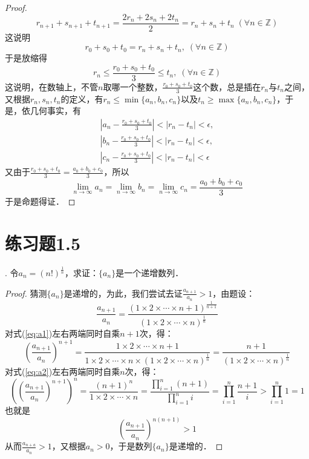 \documentclass{ctexart}
\theoremstyle{definition}
\theoremstyle{definition}
\theoremstyle{plain}
\theoremstyle{plain}
\theoremstyle{plain}
\theoremstyle{definition}
\newcommand{\integer}{\mathbb{Z}}
\begin{document}
\begin{proof}
\begin{equation}
    r_{n+1}+s_{n+1}+t_{n+1} = \frac{2r_n+2s_n+2t_n}{2} = r_n + s_n + t_n \; (\forall n \in \integer)
\end{equation}
这说明
\begin{equation}
    r_0+s_0+t_0=r_n+s_n+t_n, \; (\forall n \in \integer)
\end{equation}
于是放缩得
\begin{equation}
    r_n \leq \frac{r_0+s_0+t_0}{3} \leq t_n, \; (\forall n \in \integer)
\end{equation}
这说明，在数轴上，不管$n$取哪一个整数，$\displaystyle\frac{r_0+s_0+t_0}{3}$这个数，总是插在$r_n$与$t_n$之间，又根据$r_n,s_n,t_n$的定义，有$r_n \leq \min \{a_n,b_n,c_n\}$以及$t_n \geq \max \{a_n, b_n, c_n \}$，于是，依几何事实，有
\begin{align}
    |a_n - \frac{r_0+s_0+t_0}{3}| < |r_n - t_n| < \epsilon, \\
    |b_n - \frac{r_0+s_0+t_0}{3}| < |r_n - t_n| < \epsilon, \\
    |c_n - \frac{r_0+s_0+t_0}{3}| < |r_n - t_n| < \epsilon
\end{align}
又由于$\displaystyle\frac{r_0+s_0+t_0}{3}=\frac{a_0+b_0+c_0}{3}$，所以
\begin{equation}
    \lim_{n\to\infty} a_n = \lim_{n\to\infty} b_n = \lim_{n\to\infty} c_n = \frac{a_0+b_0+c_0}{3}
\end{equation}
于是命题得证．
\end{proof}


\section*{练习题1.5}
. 令$\displaystyle a_n = (n!)^\frac{1}{n}$，求证：$\{ a_n \}$是一个递增数列．
\begin{proof}
猜测$\{ a_n \}$是递增的，为此，我们尝试去证$\displaystyle \frac{a_{n+1}}{a_n} > 1$，由题设：
\begin{equation}
    \frac{a_{n+1}}{a_n} = \frac{(1 \times 2 \times \cdots \times n+1)^\frac{1}{n+1}}{(1 \times 2 \times \cdots \times n)^\frac{1}{n}}
    \label{eq:a1}
\end{equation}
对式(\ref{eq:a1})左右两端同时自乘$n+1$次，得：
\begin{equation}
    \left( \frac{a_{n+1}}{a_n} \right)^{n+1} = \frac{1 \times 2 \times \cdots \times n+1}{1 \times 2 \times \cdots \times n \times (1 \times 2 \times \cdots \times n)^\frac{1}{n}} = \frac{n+1}{(1 \times 2 \times \cdots \times n)^\frac{1}{n}}
    \label{eq:a2}
\end{equation}
对式(\ref{eq:a2})左右两端同时自乘$n$次，得：
\begin{equation}
    \left(\left(\frac{a_{n+1}}{a_n} \right)^{n+1}\right)^{n} = \frac{(n+1)^n}{1 \times 2 \times \cdots \times n} = \frac{\prod_{i=1}^{n} \left( n+1 \right) }{\prod_{i=1}^{n} i} = \prod_{i=1}^n \frac{n+1}{i} > \prod_{i=1}^{n} 1 = 1
\end{equation}
也就是
\begin{equation}
   \left( \frac{a_{n+1}}{a_n} \right)^{n (n+1)} > 1
\end{equation}
从而$\displaystyle \frac{a_{n+a}}{a_n} >1$，又根据$a_n > 0$，于是数列$\{ a_n \}$是递增的．
\end{proof}
\end{document}
